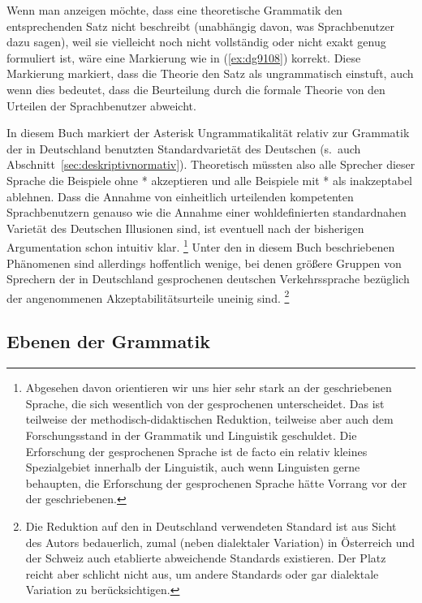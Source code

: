 Wenn man anzeigen möchte, dass eine theoretische Grammatik den entsprechenden Satz nicht beschreibt (unabhängig davon, was Sprachbenutzer dazu sagen), weil sie vielleicht noch nicht vollständig oder nicht exakt genug formuliert ist, wäre eine Markierung wie in (\ref{ex:dg9108}) korrekt.
Diese Markierung markiert, dass die Theorie den Satz als ungrammatisch einstuft, auch wenn dies bedeutet, dass die Beurteilung durch die formale Theorie von den Urteilen der Sprachbenutzer abweicht.

\begin{exe}
\end{exe}

In diesem Buch markiert der Asterisk Ungrammatikalität relativ zur Grammatik der in Deutschland benutzten Standardvarietät des Deutschen (s.\ auch Abschnitt~\ref{sec:deskriptivnormativ}).
Theoretisch müssten also alle Sprecher dieser Sprache die Beispiele ohne * akzeptieren und alle Beispiele mit * als inakzeptabel ablehnen.
Dass die Annahme von einheitlich urteilenden kompetenten Sprachbenutzern genauso wie die Annahme einer wohldefinierten standardnahen Varietät des Deutschen Illusionen sind, ist eventuell nach der bisherigen Argumentation schon intuitiv klar.%
\footnote{Abgesehen davon orientieren wir uns hier sehr stark an der geschriebenen Sprache, die sich wesentlich von der gesprochenen unterscheidet.
Das ist teilweise der methodisch-didaktischen Reduktion, teilweise aber auch dem Forschungsstand in der Grammatik und Linguistik geschuldet.
Die Erforschung der gesprochenen Sprache ist de facto ein relativ kleines Spezialgebiet innerhalb der Linguistik, auch wenn Linguisten gerne behaupten, die Erforschung der gesprochenen Sprache hätte Vorrang vor der der geschriebenen.}
Unter den in diesem Buch beschriebenen Phänomenen sind allerdings hoffentlich wenige, bei denen größere Gruppen von Sprechern der in Deutschland gesprochenen deutschen Verkehrssprache bezüglich der angenommenen Akzeptabilitätsurteile uneinig sind.%
\footnote{Die Reduktion auf den in Deutschland verwendeten Standard ist aus Sicht des Autors bedauerlich, zumal (neben dialektaler Variation) in Österreich und der Schweiz auch etablierte abweichende Standards existieren.
Der Platz reicht aber schlicht nicht aus, um andere Standards oder gar dialektale Variation zu berücksichtigen.}

\subsection{Ebenen der Grammatik}

